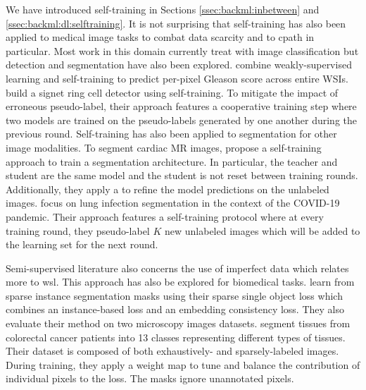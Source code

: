 We have introduced self-training in Sections \ref{ssec:backml:inbetween} and \ref{ssec:backml:dl:selftraining}. It is not surprising that self-training has also been applied to medical image tasks to combat data scarcity \parencite{tajbakhsh2020embracing, peng2021medical} and to \acrlong{cpath} in particular. Most work in this domain currently treat with image classification \parencite{peikari2018cluster, su2019local, koohbanani2021self, jaiswal2019semi, shaw2020teacher} but detection and segmentation have also been explored. \parencite{li2018based} combine weakly-supervised learning and self-training to predict per-pixel Gleason score across entire WSIs. \parencite{li2019signet} build a signet ring cell detector using self-training. To mitigate the impact of erroneous pseudo-label, their approach features a cooperative training step where two models are trained on the pseudo-labels generated by one another during the previous round. Self-training has also been applied to segmentation for other image modalities. To segment cardiac MR images, \parencite{bai2017semi} propose a self-training approach to train a segmentation architecture. In particular, the teacher and student are the same model and the student is not reset between training rounds. Additionally, they apply a  to refine the model predictions on the unlabeled images. \parencite{fan2020inf} focus on lung infection segmentation in the context of the COVID-19 pandemic. Their approach features a self-training protocol where at every training round, they pseudo-label $K$ new unlabeled images which will be added to the learning set for the next round. 

Semi-supervised literature also concerns the use of imperfect data which relates more to \acrlong{wsl}. This approach has also be explored for biomedical tasks. \parencite{wolny2021sparse} learn from sparse instance segmentation masks using their sparse single object loss which combines an instance-based loss and an embedding consistency loss. They also evaluate their method on two microscopy images datasets. \parencite{bokhorst2018learning} segment tissues from colorectal cancer patients into 13 classes representing different types of tissues. Their dataset is composed of both exhaustively- and sparsely-labeled images. During training, they apply a weight map to tune and balance the contribution of individual pixels to the loss. The masks ignore unannotated pixels.
